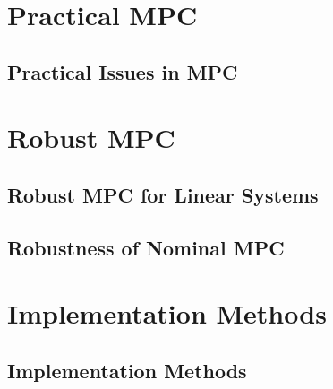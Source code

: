 \documentclass[11pt,a4paper]{book}
\begin{document}
\part{Practical MPC}
\chapter{Practical Issues in MPC}


\part{Robust MPC}
\chapter{Robust MPC for Linear Systems}


\chapter{Robustness of Nominal MPC}


\part{Implementation Methods}
\chapter{Implementation Methods}

\end{document}
